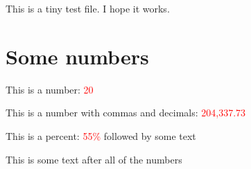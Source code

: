 \documentclass[12pt]{article}
\newcommand{\jsonsub}[2][XXXXX]{\textcolor{red}{#1}}
\begin{document}
This is a tiny test file. I hope it works.

\section{Some numbers}

This is a number: \jsonsub[20]{plainnumber}

This is a number with commas and decimals: \jsonsub[204,337.73]{comma}

This is a percent: \jsonsub[55\%]{percent} followed by some text

This is some text after all of the numbers
\end{document}
